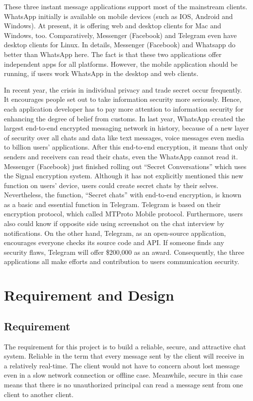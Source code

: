 \documentclass[a4paper,11pt]{article}
\begin{document}
These three instant message applications support most of the mainstream clients. WhatsApp initially is available on mobile devices (such as IOS, Android and Windows). At present, it is offering web and desktop clients for Mac and Windows, too. Comparatively, Messenger (Facebook) and Telegram even have desktop clients for Linux. In details, Messenger (Facebook) and Whatsapp do better than WhatsApp here. The fact is that these two applications offer independent apps for all platforms.  However, the mobile application should be   running, if users work WhatsApp in the desktop and web clients.

In recent year, the crisis in individual privacy and trade secret occur frequently. It encourages people set out to take information security more seriously. Hence, each application developer has to pay more attention to information security for enhancing the degree of belief from customs. In last year, WhatsApp created the largest end-to-end encrypted messaging network in history, because of a new layer of security over all chats and data like text messages, voice messages even media to billion users’ applications. After this end-to-end encryption, it means that only senders and receivers can read their chats, even the WhatsApp cannot read it. Messenger (Facebook) just finished rolling out “Secret Conversations” which uses the Signal encryption system. Although it has not explicitly mentioned this new function on users’ device, users could create secret chats by their selves. Nevertheless, the function, “Secret chats” with end-to-end encryption, is known as a basic and essential function in Telegram. Telegram is based on their encryption protocol, which called MTProto Mobile protocol. Furthermore, users also could know if opposite side using screenshot on the chat interview by notifications. On the other hand, Telegram, as an open-source application, encourages everyone checks its source code and API. If someone finds any security flaws, Telegram will offer \$200,000 as an award. Consequently, the three applications all make efforts and contribution to users communication security.


\section{Requirement and Design}
\subsection{Requirement}
The requirement for this project is to build a reliable, secure, and attractive chat system. Reliable in the term that every message sent by the client will receive in a relatively real-time. The client would not have to concern about lost message even in a slow network connection or offline case. Meanwhile, secure in this case means that there is no unauthorized principal can read a message sent from one client to another client.
\end{document}
